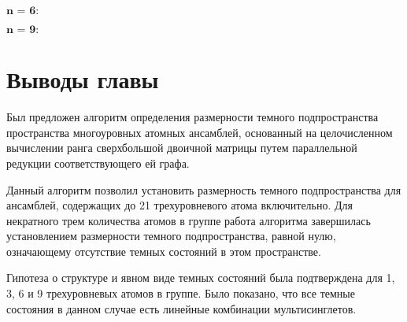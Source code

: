 \noindent $\textbf{n = 6:}$
\begin{figure}[h]
	\label{figCurves}
\end{figure}

\clearpage
\noindent $\textbf{n = 9:}$
\begin{figure}[h]
	\label{figCurves}
\end{figure}

\begin{figure}[h]
	\label{figCurves}
\end{figure}

\clearpage
\section{Выводы главы}\label{sec:ch4/sect4}
Был предложен алгоритм определения размерности темного подпростран­ства пространства многоуровных атомных ансамблей, основанный на целочисленном вычислении ранга сверхбольшой двоичной матрицы путем параллельной редукции соответствующего ей графа.

Данный алгоритм позволил установить размерность темного подпростран­ства для ансамблей, содержащих до 21 трехуровневого атома включительно. Для некратного трем количества атомов в группе работа алгоритма завер­шилась установлением размерности темного подпространства, равной нулю, означающему отсутствие темных состояний в этом пространстве.

Гипотеза о структуре и явном виде темных состояний была подтверждена для 1, 3, 6 и 9 трехуровневых атомов в группе. Было показано, что все темные состояния в данном случае есть линейные комбинации мультисинглетов.